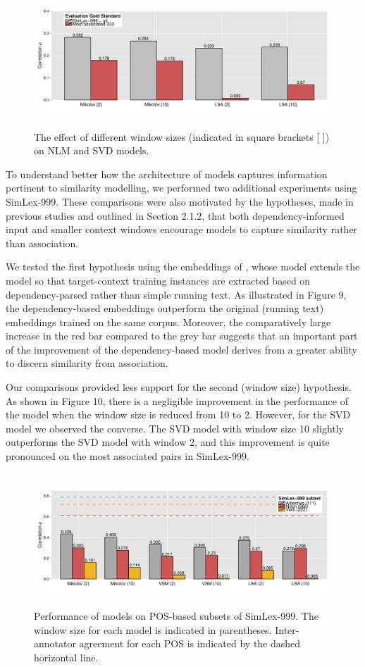 \begin{figure}[]  \includegraphics[width = \textwidth,height=5cm]{Chapter_3/Figure_3B_CL}  \caption{The effect of different window sizes (indicated in square brackets [ ]) on NLM and SVD models. }\end{figure}

To understand better how the architecture of models captures information pertinent to similarity modelling, we performed two additional experiments using SimLex-999. These comparisons were also motivated by the hypotheses, made in previous studies and outlined in Section 2.1.2, that both dependency-informed input and smaller context windows encourage models to capture similarity rather than association. 

We tested the first hypothesis using the embeddings of \cite{levy2014dependency}, whose model extends the \cite{mikolov2013efficient} model so that target-context training instances are extracted based on dependency-parsed rather than simple running text. As illustrated in Figure 9, the dependency-based embeddings outperform the original (running text) embeddings trained on the same corpus. Moreover, the comparatively large increase in the red bar compared to the grey bar suggests that an important part of the improvement of the dependency-based model derives from a greater ability to discern similarity from association. 

Our comparisons provided less support for the second (window size) hypothesis. As shown in Figure 10, there is a negligible improvement in the performance of the \cite{} model when the window size is reduced from 10 to 2. However, for the SVD model we observed the converse. The SVD model with window size 10 slightly outperforms the SVD model with window 2, and this improvement is quite pronounced on the most associated pairs in SimLex-999. 

\begin{figure}[]  \includegraphics[width = \textwidth,height=5cm]{Chapter_3/Figure_5_CL}  \caption{Performance of models on POS-based subsets of SimLex-999. The window size for each model is indicated in parentheses. Inter-annotator agreement for each POS is indicated by the dashed horizontal line.}\end{figure}

